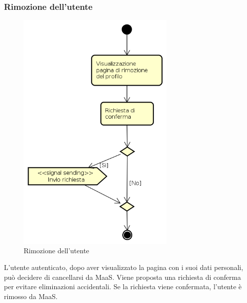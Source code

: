 \subsubsection{Rimozione dell'utente}
\begin{figure}[H]
\begin{center}
\includegraphics[height=12cm]{res/sections/backend/activities/rimuoviProfilo.png}
\caption{Rimozione dell'utente}
\end{center}
\end{figure}
L'utente autenticato, dopo aver visualizzato la pagina con i suoi dati personali, può decidere di cancellarsi da MaaS. Viene proposta una richiesta di conferma per evitare eliminazioni accidentali. Se la richiesta viene confermata, l'utente è rimosso da MaaS.
